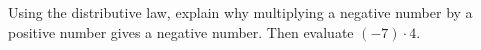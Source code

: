 Using the distributive law, explain why multiplying a negative number by a positive number gives a negative number. Then evaluate $(-7)\cdot4$.
